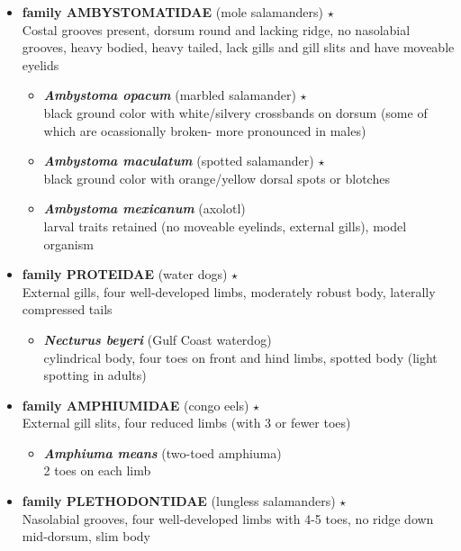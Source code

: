 \documentclass[a4paper,12pt]{article}
\begin{document}
\begin{description}
\begin{itemize}
\begin{itemize}
  \end{itemize}
  \item{\textbf{family AMBYSTOMATIDAE} (mole salamanders) $\star$} \\ Costal grooves present, dorsum round and lacking ridge, no nasolabial grooves, heavy bodied, heavy tailed, lack gills and gill slits and have moveable eyelids
  \begin{itemize}
    \item{\textbf{\textit{   Ambystoma opacum}} (marbled salamander) $\star$} \\ black ground color with white/silvery crossbands on dorsum (some of which are ocassionally broken- more pronounced in males)
    \item{\textbf{\textit{   Ambystoma maculatum}} (spotted salamander) $\star$} \\ black ground color with orange/yellow dorsal spots or blotches
    \item{\textbf{\textit{   Ambystoma mexicanum}} (axolotl)} \\ larval traits retained (no moveable eyelinds, external gills), model organism
  \end{itemize}
  \item{\textbf{family PROTEIDAE} (water dogs) $\star$} \\ External gills, four well-developed limbs, moderately robust body, laterally compressed tails
  \begin{itemize}
    \item{\textbf{\textit{   Necturus beyeri}} (Gulf Coast waterdog)} \\ cylindrical body, four toes on front and hind limbs, spotted body (light spotting in adults)
  \end{itemize}
  \item{\textbf{family AMPHIUMIDAE} (congo eels) $\star$} \\ External gill slits, four reduced limbs (with 3 or fewer toes)
  \begin{itemize}
    \item{\textbf{\textit{   Amphiuma means}} (two-toed amphiuma)} \\ 2 toes on each limb
  \end{itemize}
  \item{\textbf{family PLETHODONTIDAE} (lungless salamanders) $\star$} \\ Nasolabial grooves, four well-developed limbs with 4-5 toes, no ridge down mid-dorsum, slim body
  \begin{itemize}

\end{itemize}
\end{itemize}
\end{description}
\end{document}

